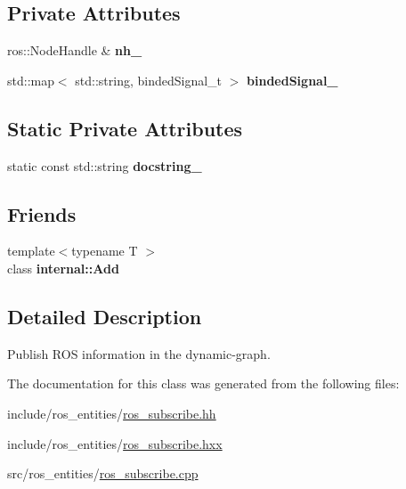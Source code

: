 \subsection*{Private Attributes}
\begin{DoxyCompactItemize}
\item 
ros\+::\+Node\+Handle \& {\bfseries nh\+\_\+}\hypertarget{classdynamic__graph_1_1RosSubscribe_af3ad89b1e8e131eee45f0236c3cd0bbd}{}\label{classdynamic__graph_1_1RosSubscribe_af3ad89b1e8e131eee45f0236c3cd0bbd}

\item 
std\+::map$<$ std\+::string, binded\+Signal\+\_\+t $>$ {\bfseries binded\+Signal\+\_\+}\hypertarget{classdynamic__graph_1_1RosSubscribe_a7f8a41ae314f370a4a33157741a2d8f1}{}\label{classdynamic__graph_1_1RosSubscribe_a7f8a41ae314f370a4a33157741a2d8f1}

\end{DoxyCompactItemize}
\subsection*{Static Private Attributes}
\begin{DoxyCompactItemize}
\item 
static const std\+::string {\bfseries docstring\+\_\+}\hypertarget{classdynamic__graph_1_1RosSubscribe_a43579b54927302d427976ba218b2636b}{}\label{classdynamic__graph_1_1RosSubscribe_a43579b54927302d427976ba218b2636b}

\end{DoxyCompactItemize}
\subsection*{Friends}
\begin{DoxyCompactItemize}
\item 
{\footnotesize template$<$typename T $>$ }\\class {\bfseries internal\+::\+Add}\hypertarget{classdynamic__graph_1_1RosSubscribe_aff86e359edc93019ec7be05f8207a40d}{}\label{classdynamic__graph_1_1RosSubscribe_aff86e359edc93019ec7be05f8207a40d}

\end{DoxyCompactItemize}


\subsection{Detailed Description}
Publish R\+OS information in the dynamic-\/graph. 

The documentation for this class was generated from the following files\+:\begin{DoxyCompactItemize}
\item 
include/ros\+\_\+entities/\hyperlink{ros__subscribe_8hh}{ros\+\_\+subscribe.\+hh}\item 
include/ros\+\_\+entities/\hyperlink{ros__subscribe_8hxx}{ros\+\_\+subscribe.\+hxx}\item 
src/ros\+\_\+entities/\hyperlink{ros__subscribe_8cpp}{ros\+\_\+subscribe.\+cpp}\end{DoxyCompactItemize}

